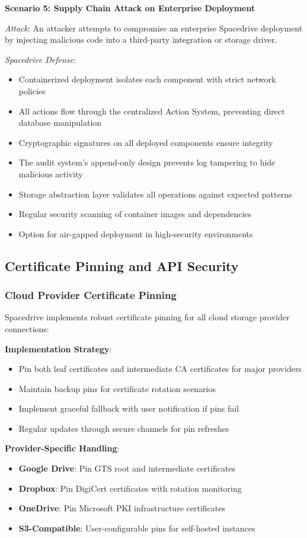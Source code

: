 \documentclass[sigconf]{acmart}
\begin{document}
\textbf{Scenario 5: Supply Chain Attack on Enterprise Deployment}

\emph{Attack}: An attacker attempts to compromise an enterprise Spacedrive deployment by injecting malicious code into a third-party integration or storage driver.

\emph{Spacedrive Defense}:
\begin{itemize}[noitemsep, topsep=0pt]
\item Containerized deployment isolates each component with strict network policies
\item All actions flow through the centralized Action System, preventing direct database manipulation
\item Cryptographic signatures on all deployed components ensure integrity
\item The audit system's append-only design prevents log tampering to hide malicious activity
\item Storage abstraction layer validates all operations against expected patterns
\item Regular security scanning of container images and dependencies
\item Option for air-gapped deployment in high-security environments
\end{itemize}

\subsection{Certificate Pinning and API Security}
\subsubsection{Cloud Provider Certificate Pinning}
Spacedrive implements robust certificate pinning for all cloud storage provider connections:

\textbf{Implementation Strategy}:
\begin{itemize}[noitemsep, topsep=0pt]
\item Pin both leaf certificates and intermediate CA certificates for major providers
\item Maintain backup pins for certificate rotation scenarios
\item Implement graceful fallback with user notification if pins fail
\item Regular updates through secure channels for pin refreshes
\end{itemize}

\textbf{Provider-Specific Handling}:
\begin{itemize}[noitemsep, topsep=0pt]
\item \textbf{Google Drive}: Pin GTS root and intermediate certificates
\item \textbf{Dropbox}: Pin DigiCert certificates with rotation monitoring
\item \textbf{OneDrive}: Pin Microsoft PKI infrastructure certificates
\item \textbf{S3-Compatible}: User-configurable pins for self-hosted instances
\end{itemize}
\end{document}

